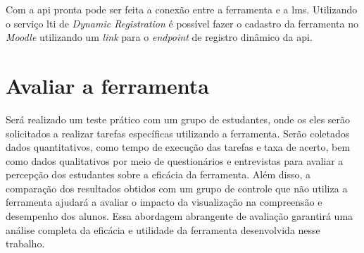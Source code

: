 \setlength{\abovecaptionskip}{10pt plus 0pt minus 0pt}
\setlength{\belowcaptionskip}{5pt plus 0pt minus 0pt}
\begin{table}[h]
\centering\setlength{\extrarowheight}{2pt}
\label{qua:endpoints}
{}
\end{table}

Com a \gls{api} pronta pode ser feita a conexão entre a ferramenta e a \gls{lms}. Utilizando o serviço \gls{lti} de \textit{Dynamic Registration} é possível fazer o cadastro da ferramenta no \textit{Moodle} utilizando um \textit{link} para o \textit{endpoint} de registro dinâmico da \gls{api}.

\section{Avaliar a ferramenta}
Será realizado um teste prático com um grupo de estudantes, onde os eles serão solicitados a realizar tarefas específicas utilizando a ferramenta. Serão coletados dados quantitativos, como tempo de execução das tarefas e taxa de acerto, bem como dados qualitativos por meio de questionários e entrevistas para avaliar a percepção dos estudantes sobre a eficácia da ferramenta. Além disso, a comparação dos resultados obtidos com um grupo de controle que não utiliza a ferramenta ajudará a avaliar o impacto da visualização na compreensão e desempenho dos alunos. Essa abordagem abrangente de avaliação garantirá uma análise completa da eficácia e utilidade da ferramenta desenvolvida nesse trabalho.


